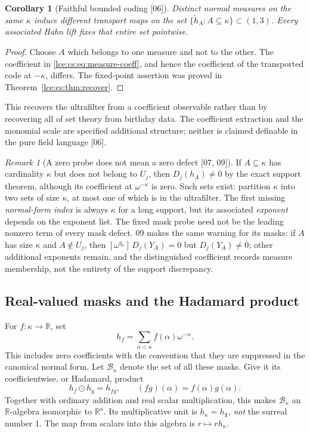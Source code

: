 \documentclass[11pt,letterpaper]{article}
\numberwithin{equation}{section}
\newtheorem{corollary}[theorem]{Corollary}
\theoremstyle{definition}
\theoremstyle{remark}
\newtheorem{remark}[theorem]{Remark}
\newcommand{\R}{\mathbb R}
\newcommand{\coef}[2]{[\omega^{#1}]\,#2}
\newcommand{\thref}[1]{Theorem~\ref{#1}}
\newcommand{\src}[1]{\textup{\textsf{\small[#1]}}}%
\begin{document}
\begin{corollary}[Faithful bounded coding \src{06}]\label{lce:cs:cor:faithful}
Distinct normal measures on the same $\kappa$ induce different transport
maps on the set $\{\tilde h_A:A\subseteq\kappa\}\subset(1,3)$. Every
associated Hahn lift fixes that entire set pointwise.
\end{corollary}
\begin{proof}
Choose $A$ which belongs to one measure and not to the other. The
coefficient in \eqref{lce:cs:eq:measure-coeff}, and hence the coefficient of
the transported code at $-\kappa$, differs. The fixed-point assertion was
proved in \thref{lce:cs:thm:recover}.
\end{proof}
This recovers the ultrafilter from a coefficient observable rather than by
recovering all of set theory from birthday data. The coefficient extraction
and the monomial scale are specified additional structure; neither is
claimed definable in the pure field language \src{06}.

\begin{remark}[A zero probe does not mean a zero defect \src{07, 09}]
If $A\subseteq\kappa$ has cardinality $\kappa$ but does not belong to
$U_j$, then $D_j(h_A)\ne0$ by the exact support theorem, although its
coefficient at $\omega^{-\kappa}$ is zero. Such sets exist: partition
$\kappa$ into two sets of size $\kappa$, at most one of which is in the
ultrafilter. The first missing \emph{normal-form index} is always
$\kappa$ for a long support, but its associated \emph{exponent} depends
on the exponent list. The fixed mask probe need not be the leading
nonzero term of every mask defect.
09 makes the same warning for its masks: if $A$ has size $\kappa$ and
$A\notin U_j$, then $\coef{q_\kappa}{D_j(Y_A)}=0$ but $D_j(Y_A)\ne0$; other
additional exponents remain, and the distinguished coefficient records
measure membership, not the entirety of the support discrepancy.
\end{remark}

\subsection{Real-valued masks and the Hadamard product}
For $f:\kappa\to\R$, set
\begin{equation}\label{lce:eq:hf}
 h_f=\sum_{\alpha<\kappa} f(\alpha)\omega^{-\alpha}.
\end{equation}
This includes zero coefficients with the convention that they are suppressed
in the canonical normal form. Let $\mathcal B_\kappa$ denote the set of
all these masks. Give it its coefficientwise, or Hadamard, product
\begin{equation}\label{lce:eq:hadamard}
 h_f\odot h_g=h_{fg},\qquad (fg)(\alpha)=f(\alpha)g(\alpha).
\end{equation}
Together with ordinary addition and real scalar multiplication, this makes
$\mathcal B_\kappa$ an $\R$-algebra isomorphic to $\R^\kappa$.
Its multiplicative unit is $h_\kappa=h_{\mathbf 1}$, \emph{not} the surreal
number 1. The map from scalars into this algebra is
$r\mapsto r h_\kappa$.
\end{document}
